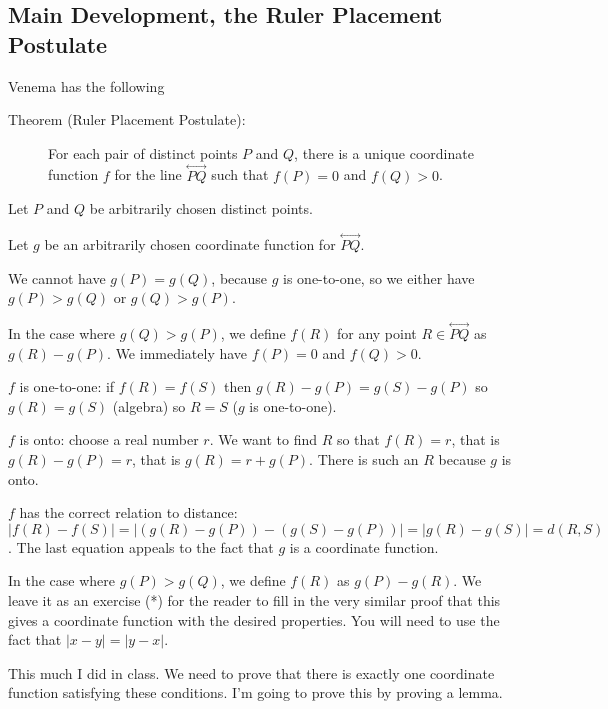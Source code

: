\documentclass[12pt]{article}
\newcommand\Line[1]{\overset{\leftrightarrow}{#1}}
\begin{document}
\subsection{Main Development, the Ruler Placement Postulate}

Venema has the following 

\begin{description}

\item[Theorem (Ruler Placement Postulate):]
For each pair of distinct points $P$ and $Q$, there is a unique coordinate function $f$ for the line $\Line{PQ}$ such that $f(P)=0$ and
$f(Q)>0$.

\end{description}

Let $P$ and $Q$ be arbitrarily chosen distinct points.

Let $g$ be an arbitrarily chosen coordinate function for $\Line{PQ}$.

We cannot have $g(P)=g(Q)$, because $g$ is one-to-one, so we either have $g(P)>g(Q)$ or $g(Q)>g(P)$.

In the case where $g(Q)>g(P)$, we define $f(R)$ for any point $R \in \Line{PQ}$ as $g(R)-g(P)$.   We immediately have $f(P)=0$ and $f(Q)>0$. 

$f$ is one-to-one:  if $f(R)=f(S)$  then $g(R)-g(P)=g(S)-g(P)$ so $g(R)=g(S)$ (algebra) so $R=S$ ($g$ is one-to-one).

$f$ is onto:  choose a real number $r$.  We want to find $R$ so that $f(R)=r$, that is $g(R)-g(P)=r$, that is $g(R) = r+g(P)$.  There is such an $R$
because $g$ is onto.

$f$ has the correct relation to distance:  $|f(R)-f(S)| = |(g(R)-g(P))-(g(S)-g(P))| = |g(R)-g(S)| = d(R,S)$.  The last equation appeals to the fact that $g$ is a coordinate function.

In the case where $g(P)>g(Q)$, we define $f(R)$ as $g(P)-g(R)$.  We leave it as an exercise (*) for the reader to fill in the very similar proof that this gives a coordinate function with the desired properties.  You will need to use the fact that $|x-y|=|y-x|$.

This much I did in class.   We need to prove that there is exactly one coordinate function satisfying these conditions.  I'm going to prove this by proving a lemma.
\end{document}
